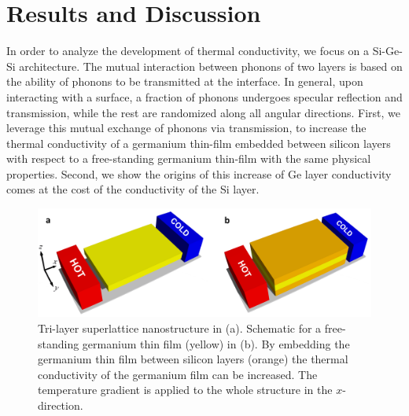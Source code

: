 \section{Results and Discussion}
In order to analyze the development of thermal conductivity, we focus on a Si-Ge-Si architecture. The mutual interaction between phonons of two layers is based on the ability of phonons to be transmitted at the interface. In general, upon interacting with a surface, a fraction of phonons undergoes specular reflection and transmission, while the rest are randomized along all angular directions. First, we leverage this mutual exchange of phonons via transmission, to increase the thermal conductivity of a germanium thin-film embedded between silicon layers with respect to a free-standing germanium thin-film with the same physical properties. Second, we show the origins of this increase of Ge layer conductivity comes at the cost of the conductivity of the Si layer.  
\begin{figure}[hbt]
  \centering \includegraphics[width=1.0\textwidth]{figures/ch5/Fig1tl.jpg}
  \caption{Tri-layer superlattice nanostructure in (a). Schematic for a free-standing germanium thin film (yellow) in (b). By embedding the germanium thin film between silicon layers (orange) the thermal conductivity of the germanium film can be increased. The temperature gradient is applied to the whole structure in the $x$-direction.}
  \label{fig:ch5-tl}
\end{figure}

